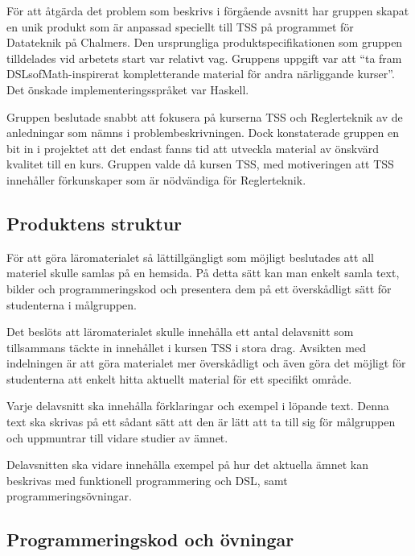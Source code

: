 \documentclass[]{article}
\begin{document}

För att åtgärda det problem som beskrivs i förgående avsnitt har
gruppen skapat en unik produkt som är anpassad speciellt till TSS på
programmet för Datateknik på Chalmers. Den ursprungliga
produktspecifikationen som gruppen tilldelades vid arbetets start var
relativt vag. Gruppens uppgift var att ``ta fram DSLsofMath-inspirerat
kompletterande material för andra närliggande kurser''. Det önskade
implementeringsspråket var Haskell.

Gruppen beslutade snabbt att fokusera på kurserna TSS och Reglerteknik
av de anledningar som nämns i problembeskrivningen. Dock konstaterade
gruppen en bit in i projektet att det endast fanns tid att utveckla
material av önskvärd kvalitet till en kurs. Gruppen valde då kursen
TSS, med motiveringen att TSS innehåller förkunskaper som är
nödvändiga för Reglerteknik.

\subsection{Produktens struktur}
För att göra läromaterialet så lättillgängligt som möjligt beslutades att
all materiel skulle samlas på en hemsida. På detta sätt kan man enkelt
samla text, bilder och programmeringskod och presentera dem på ett
överskådligt sätt för studenterna i målgruppen.

Det beslöts att läromaterialet skulle innehålla ett antal delavsnitt
som tillsammans täckte in innehållet i kursen TSS i stora drag.
Avsikten med indelningen är att göra materialet mer överskådligt och
även göra det möjligt för studenterna att enkelt hitta aktuellt
material för ett specifikt område.

Varje delavsnitt ska innehålla förklaringar och exempel i löpande text.
Denna text ska skrivas på ett sådant sätt att den är lätt att ta till
sig för målgruppen och uppmuntrar till vidare studier av ämnet.

Delavsnitten ska vidare innehålla exempel på hur det aktuella ämnet kan
beskrivas med funktionell programmering och DSL, samt programmeringsövningar.

\subsection{Programmeringskod och övningar}
\end{document}
